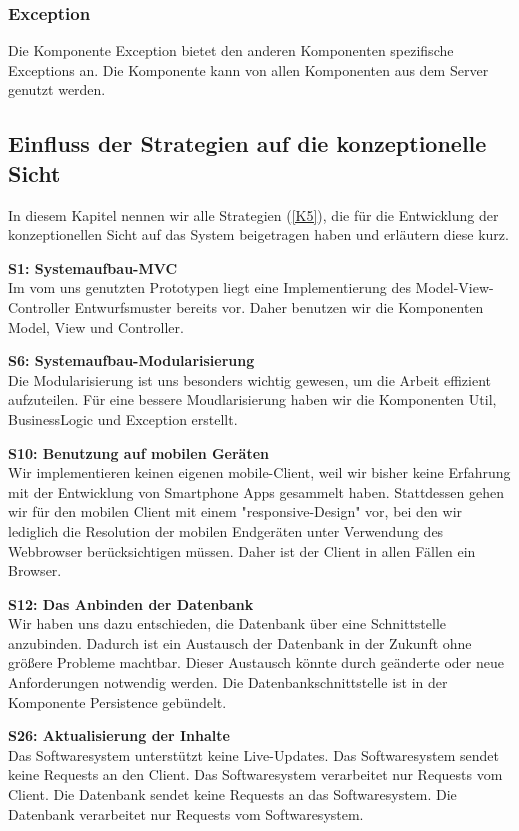 {\subsubsection{Exception}
{Die Komponente Exception bietet den anderen Komponenten spezifische Exceptions an. Die Komponente kann von allen Komponenten aus dem Server genutzt werden. 
}

\subsection{Einfluss der Strategien auf die konzeptionelle Sicht}
{In diesem Kapitel nennen wir alle Strategien (\ref{K5}), die für die Entwicklung der konzeptionellen Sicht auf das System beigetragen haben und erläutern diese kurz. 
\vspace*{10px}

\textbf{S1: Systemaufbau-MVC}\\
Im vom uns genutzten Prototypen liegt eine Implementierung des Model-View-Controller Entwurfsmuster bereits vor. Daher benutzen wir die Komponenten Model, View und Controller. 
\vspace*{10px}

\textbf{S6: Systemaufbau-Modularisierung}\\
Die Modularisierung ist uns besonders wichtig gewesen, um die Arbeit effizient aufzuteilen.
Für eine bessere Moudlarisierung haben wir die Komponenten Util, BusinessLogic und Exception erstellt. 
\vspace*{10px}

\textbf{S10: Benutzung auf mobilen Geräten}\\
Wir implementieren keinen eigenen mobile-Client, weil wir bisher keine Erfahrung mit der Entwicklung von Smartphone Apps gesammelt haben. Stattdessen gehen wir für den mobilen Client mit einem "responsive-Design" vor, bei den wir lediglich die Resolution der mobilen Endgeräten unter Verwendung des Webbrowser berücksichtigen müssen. Daher ist der Client in allen Fällen ein Browser.
\vspace*{10px}

\textbf{S12: Das Anbinden der Datenbank}\\
Wir haben uns dazu entschieden, die Datenbank über eine Schnittstelle anzubinden. Dadurch ist ein Austausch der Datenbank in der Zukunft ohne größere Probleme machtbar. Dieser Austausch könnte durch geänderte oder neue Anforderungen notwendig werden. Die Datenbankschnittstelle ist in der Komponente Persistence gebündelt. }
\vspace*{10px}

\textbf{S26: Aktualisierung der Inhalte}\\
Das Softwaresystem unterstützt keine Live-Updates. Das Softwaresystem sendet keine Requests an den Client. Das Softwaresystem verarbeitet nur Requests vom Client. Die Datenbank sendet keine Requests an das Softwaresystem. Die Datenbank verarbeitet nur Requests vom Softwaresystem.}
